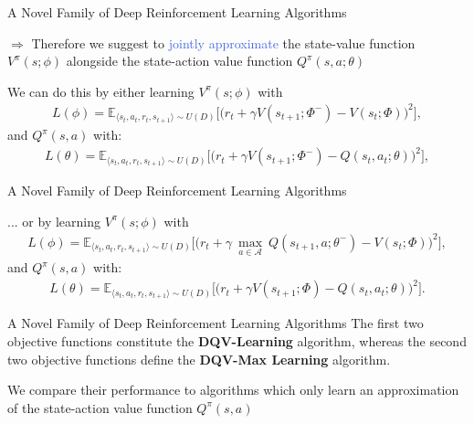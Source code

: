 \documentclass{beamer}
\begin{document}
\begin{frame}{A Novel Family of Deep Reinforcement Learning Algorithms}
	\bigskip

	$\Rightarrow$ Therefore we suggest to \textcolor{RoyalBlue}{jointly approximate} the state-value function $V^{\pi}(s;\phi)$ alongside the state-action value function $Q^{\pi}(s,a;\theta)$

	\bigskip

	We can do this by either learning $V^{\pi}(s;\phi)$ with
		\begin{multline*}
L(\phi) = \mathds{E}_{\langle s_{t},a_{t},r_{t},s_{t+1}\rangle\sim U(D)} \bigg[\big(r_{t} + \gamma V(s_{t+1}; \Phi^{-}) - V(s_{t}; \Phi)\big)^{2}\bigg],
		\end{multline*}			
		and $Q^{\pi}(s,a)$ with:
		\begin{multline*}
    			L(\theta) = \mathds{E}_{\langle s_{t},a_{t},r_{t},s_{t+1}\rangle\sim U(D)} \bigg[\big(r_{t} + \gamma V(s_{t+1}; \Phi^{-}) - Q(s_{t}, a_{t}; \theta)\big)^{2}\bigg],
		\end{multline*}

\end{frame}

\begin{frame}{A Novel Family of Deep Reinforcement Learning Algorithms}

	... or by learning $V^{\pi}(s;\phi)$ with
	\begin{multline*}
		L(\phi) = \mathds{E}_{\langle s_{t},a_{t},r_{t},s_{t+1}\rangle\sim U(D)} \bigg[\big(r_{t} + \gamma \: \underset{a\in \mathcal{A}}{\max}\: Q(s_{t+1}, a; \theta^{-}) - V(s_{t}; \Phi)\big)^{2}\bigg],
	\end{multline*}
	and $Q^{\pi}(s,a)$ with:
	\begin{multline*}
    		L(\theta) = \mathds{E}_{\langle s_{t},a_{t},r_{t},s_{t+1}\rangle\sim U(D)} \bigg[\big(r_{t} + \gamma V(s_{t+1}; \Phi) - Q(s_{t}, a_{t}; \theta)\big)^{2}\bigg].
	\end{multline*}
\end{frame}

\begin{frame}{A Novel Family of Deep Reinforcement Learning Algorithms}
	The first two objective functions constitute the \textcolor{skymagenta}{\textbf{DQV-Learning}} algorithm, whereas the second two objective functions define the \textcolor{skymagenta}{\textbf{DQV-Max Learning}} algorithm.


	\bigskip

	We compare their performance to algorithms which only learn an approximation of the state-action value function $Q^\pi(s,a)$

\end{frame}
\end{document}
